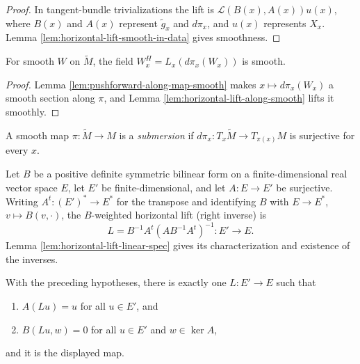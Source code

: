\begin{proof}
\leanok
\sketch In tangent-bundle trivializations the lift is $\mathcal L(B(x),A(x))u(x)$, where $B(x)$ and $A(x)$ represent $\tilde g_x$ and $d\pi_x$, and $u(x)$ represents $X_x$. Lemma \ref{lem:horizontal-lift-smooth-in-data} gives smoothness.
\end{proof}

\begin{lemma}
\label{lem:horizontal-projection-field-smooth}
\leanok
{}
For smooth $W$ on $\tilde M$, the field $W_x^H=L_x(d\pi_x(W_x))$ is smooth.
\end{lemma}

\begin{proof}
\leanok
\sketch Lemma \ref{lem:pushforward-along-map-smooth} makes $x\mapsto d\pi_x(W_x)$ a smooth section along $\pi$, and Lemma \ref{lem:horizontal-lift-along-smooth} lifts it smoothly.
\end{proof}

\begin{definition}
\label{def:submersion}
\leanok
A smooth map $\pi:\tilde M\to M$ is a \emph{submersion} if $d\pi_x:T_x\tilde M\to T_{\pi(x)}M$ is surjective for every $x$.
\end{definition}

\begin{definition}
\label{def:horizontal-lift-linear}
\leanok
Let $B$ be a positive definite symmetric bilinear form on a finite-dimensional real vector space $E$, let $E'$ be finite-dimensional, and let $A:E\to E'$ be surjective. Writing $A^t:(E')^*\to E^*$ for the transpose and identifying $B$ with $E\to E^*$, $v\mapsto B(v,\cdot)$, the $B$-weighted horizontal lift (right inverse) is
\[
L=B^{-1}A^t(AB^{-1}A^t)^{-1}:E'\to E.
\]
Lemma \ref{lem:horizontal-lift-linear-spec} gives its characterization and existence of the inverses.
\end{definition}

\begin{lemma}
\label{lem:horizontal-lift-linear-spec}
\leanok
{}
With the preceding hypotheses, there is exactly one $L:E'\to E$ such that
\begin{enumerate}
\item[(i)] $A(Lu)=u$ for all $u\in E'$, and
\item[(ii)] $B(Lu,w)=0$ for all $u\in E'$ and $w\in\ker A$,
\end{enumerate}
and it is the displayed map.
\end{lemma}


